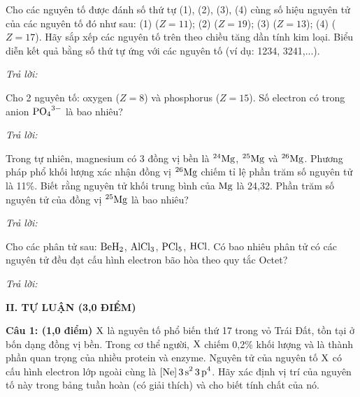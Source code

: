 \documentclass[11pt,a4paper]{article}
\begin{document}
\begin{ex}
Cho các nguyên tố được đánh số thứ tự (1), (2), (3), (4) cùng số hiệu nguyên tử của các nguyên tố đó như sau: (1) ($Z=11$); (2) ($Z=19$); (3) ($Z=13$); (4) ($Z=17$). Hãy sắp xếp các nguyên tố trên theo chiều tăng dần tính kim loại. Biểu diễn kết quả bằng số thứ tự ứng với các nguyên tố (ví dụ: 1234, 3241,...).

\noindent\textit{Trả lời:} \dotfill
\end{ex}
\begin{ex}
Cho 2 nguyên tố: oxygen ($Z = 8$) và phosphorus ($Z = 15$). Số electron có trong anion $\ce{PO4^3-}$ là bao nhiêu?

\noindent\textit{Trả lời:} \dotfill
\end{ex}
\begin{ex}
Trong tự nhiên, magnesium có 3 đồng vị bền là $^{24}\ce{Mg}$, $^{25}\ce{Mg}$ và $^{26}\ce{Mg}$. Phương pháp phổ khối lượng xác nhận đồng vị $^{26}\ce{Mg}$ chiếm tỉ lệ phần trăm số nguyên tử là 11\%. Biết rằng nguyên tử khối trung bình của $\ce{Mg}$ là 24,32. Phần trăm số nguyên tử của đồng vị $^{25}\ce{Mg}$ là bao nhiêu?

\noindent\textit{Trả lời:} \dotfill
\end{ex}
\begin{ex}
Cho các phân tử sau: $\ce{BeH2}$, $\ce{AlCl3}$, $\ce{PCl5}$, $\ce{HCl}$. Có bao nhiêu phân tử có các nguyên tử đều đạt cấu hình electron bão hòa theo quy tắc Octet?

\noindent\textit{Trả lời:} \dotfill
\end{ex}
\vspace{6pt}
\noindent
{\color{mainGreen}\textbf{\Large II. TỰ LUẬN (3,0 ĐIỂM)}}
\vspace{2pt}

\noindent
\textbf{Câu 1: (1,0 điểm)} $\ce{X}$ là nguyên tố phổ biến thứ 17 trong vỏ Trái Đất, tồn tại ở bốn dạng đồng vị bền. Trong cơ thể người, $\ce{X}$ chiếm 0,2\% khối lượng và là thành phần quan trọng của nhiều protein và enzyme. Nguyên tử của nguyên tố $\ce{X}$ có cấu hình electron lớp ngoài cùng là $\ce{[Ne] 3s^2 3p^4}$. Hãy xác định vị trí của nguyên tố này trong bảng tuần hoàn (có giải thích) và cho biết tính chất của nó.

\vspace{1pt}
\noindent
{}
\end{document}
